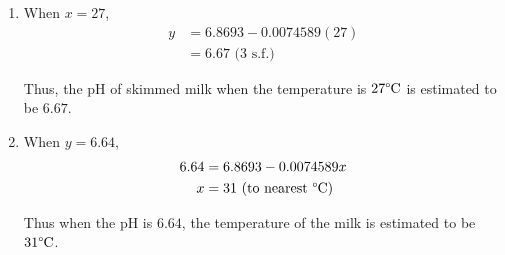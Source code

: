 \documentclass[11pt,a4paper]{book}
\begin{document}
\begin{example}
\begin{enumerate}[label=(\alph*)]

\item  When $x=27$,
\begin{align*}
y & =6.8693-0.0074589(27)\\
 & =6.67\text{ (3 s.f.)}
\end{align*}

Thus, the pH of skimmed milk when the temperature is $27\text{\textdegree C}$
is estimated to be $6.67$.

\item  When $y=6.64$,
\begin{align*}
6.64 & =6.8693-0.0074589x\\
x & =31\text{ (to nearest \textdegree C})
\end{align*}

Thus when the pH is $6.64$, the temperature of the milk is estimated
to be $31\text{\textdegree C}$.

\end{enumerate}

\end{example}

\newpage
\end{document}
